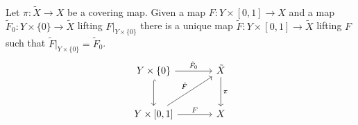 \begin{theorem}
\label{thm:homotopy lifting property}
\textup{\cite[Thm~3.23]{Warner1983}\cite[Thm~1.7(c)]{Hatcher2002}}\\
Let $\pi : \tilde{X} \to X$ be a covering map.
Given a map $F : Y \times [0,1] \to X$ and a map $\tilde{F}_0 : Y \times \{0\} \to \tilde{X}$ lifting $F|_{Y \times \{0\}}$ there is a unique map $\tilde{F} : Y \times [0,1] \to \tilde{X}$ lifting $F$ such that $\tilde{F}|_{Y \times \{0\}} = \tilde{F}_0$.
\[
\begin{tikzcd}[sep=large]
Y \times \{0\} \arrow[r, "\tilde{F}_0"] \arrow[d, hook] & \tilde{X} \arrow[d, "\pi"] \\
Y \times [0,1] \arrow[r, "F"] \arrow[ru, "\tilde{F}"] & X
\end{tikzcd}
\]
\end{theorem}
